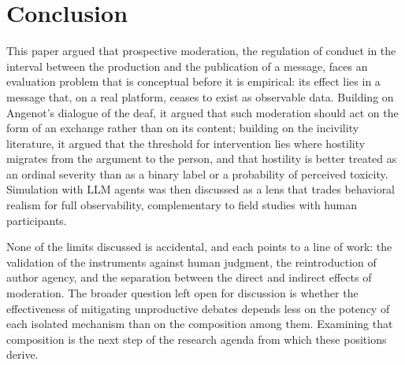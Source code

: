 \documentclass[conference]{IEEEtran}
\begin{document}
\section{Conclusion}\label{sec:conclusion}

This paper argued that prospective moderation, the regulation of conduct in
the interval between the production and the publication of a message, faces
an evaluation problem that is conceptual before it is empirical: its effect
lies in a message that, on a real platform, ceases to exist as observable
data. Building on Angenot's dialogue of the deaf, it argued that such
moderation should act on the form of an exchange rather than on its content;
building on the incivility literature, it argued that the threshold for
intervention lies where hostility migrates from the argument to the person,
and that hostility is better treated as an ordinal severity than as a binary
label or a probability of perceived toxicity. Simulation with LLM agents was
then discussed as a lens that trades behavioral realism for full
observability, complementary to field studies with human participants.

None of the limits discussed is accidental, and each points to a line of
work: the validation of the instruments against human judgment, the
reintroduction of author agency, and the separation between the direct and
indirect effects of moderation. The broader question left open for
discussion is whether the effectiveness of mitigating unproductive debates
depends less on the potency of each isolated mechanism than on the
composition among them. Examining that composition is the next step of the
research agenda from which these positions derive.



\end{document}
